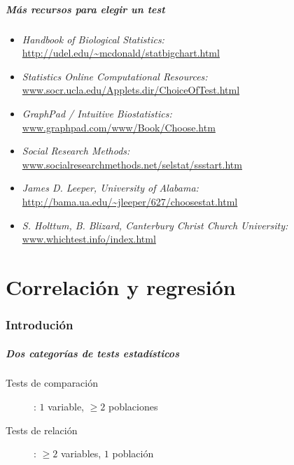 \documentclass[gray,handout,mathserif]{beamer}
\begin{document}
\begin{frame}[label=chtest8]
   \frametitle{M\'as recursos para elegir un test}
   \hspace{-5cm}
   \small
    \begin{itemize}
      \item \emph{Handbook of Biological Statistics:} \\ \url{http://udel.edu/~mcdonald/statbigchart.html}
      \item \emph{Statistics Online Computational Resources:} \\ \url{www.socr.ucla.edu/Applets.dir/ChoiceOfTest.html}
      \item \emph{GraphPad / Intuitive Biostatistics:} \\ \url{www.graphpad.com/www/Book/Choose.htm}
      \item \emph{Social Research Methods:} \\ \url{www.socialresearchmethods.net/selstat/ssstart.htm}
      \item \emph{James D. Leeper, University of Alabama:} \\ \url{http://bama.ua.edu/~jleeper/627/choosestat.html}
      \item \emph{S. Holttum, B. Blizard, Canterbury Christ Church University:} \\ \url{www.whichtest.info/index.html}
   \end{itemize}
\end{frame}%






\part[Correlaci\'on y regresi\'on]{Correlaci\'on y regresi\'on}



\section{Introduci\'on}
 

\begin{frame}[label=regrcontext]
   \frametitle{Dos categor\'ias de tests estad\'isticos}
   \begin{description}
      \item[Tests de comparaci\'on]: $1$ variable, $\geq 2$ poblaciones
      \item[Tests de relaci\'on]: $\geq 2$ variables, $1$ poblaci\'on
   \end{description}
\end{frame}%
\end{document}
